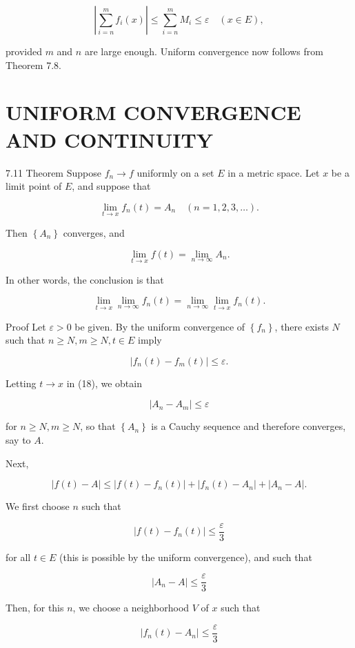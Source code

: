 \documentclass[10pt]{article}
\begin{document}
$$
\left|\sum_{i=n}^{m} f_{i}(x)\right| \leq \sum_{i=n}^{m} M_{i} \leq \varepsilon \quad(x \in E),
$$

provided $m$ and $n$ are large enough. Uniform convergence now follows from Theorem 7.8.

\section{UNIFORM CONVERGENCE AND CONTINUITY}
7.11 Theorem Suppose $f_{n} \rightarrow f$ uniformly on a set $E$ in a metric space. Let $x$ be a limit point of $E$, and suppose that

$$
\lim _{t \rightarrow x} f_{n}(t)=A_{n} \quad(n=1,2,3, \ldots) .
$$

Then $\left\{A_{n}\right\}$ converges, and

$$
\lim _{t \rightarrow x} f(t)=\lim _{n \rightarrow \infty} A_{n} .
$$

In other words, the conclusion is that

$$
\lim _{t \rightarrow x} \lim _{n \rightarrow \infty} f_{n}(t)=\lim _{n \rightarrow \infty} \lim _{t \rightarrow x} f_{n}(t) .
$$

Proof Let $\varepsilon>0$ be given. By the uniform convergence of $\left\{f_{n}\right\}$, there exists $N$ such that $n \geq N, m \geq N, t \in E$ imply

$$
\left|f_{n}(t)-f_{m}(t)\right| \leq \varepsilon .
$$

Letting $t \rightarrow x$ in (18), we obtain

$$
\left|A_{n}-A_{m}\right| \leq \varepsilon
$$

for $n \geq N, m \geq N$, so that $\left\{A_{n}\right\}$ is a Cauchy sequence and therefore converges, say to $A$.

Next,

$$
|f(t)-A| \leq\left|f(t)-f_{n}(t)\right|+\left|f_{n}(t)-A_{n}\right|+\left|A_{n}-A\right| .
$$

We first choose $n$ such that

$$
\left|f(t)-f_{n}(t)\right| \leq \frac{\varepsilon}{3}
$$

for all $t \in E$ (this is possible by the uniform convergence), and such that

$$
\left|A_{n}-A\right| \leq \frac{\varepsilon}{3}
$$

Then, for this $n$, we choose a neighborhood $V$ of $x$ such that

$$
\left|f_{n}(t)-A_{n}\right| \leq \frac{\varepsilon}{3}
$$
\end{document}
